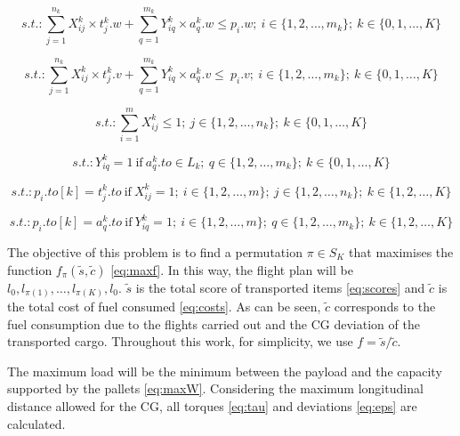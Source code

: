 \documentclass[preprint,authoryear]{elsarticle}
\begin{document}
\begin{equation} \label{eq:app2}
	s.t.: \sum_{j=1}^{n_k} X_{ij}^k \times t_j^k.w + \sum_{q=1}^{m_k} Y_{iq}^k \times a_q^k.w  \leq p_i.w; \ i \in \{1, 2, \ldots, m_k\}; \ k \in \{0, 1, \ldots, K\}
\end{equation}

\begin{equation} \label{eq:app3}
	s.t.: \sum_{j=1}^{n_k} X_{ij}^k \times t_j^k.v + \sum_{q=1}^{m_k} Y_{iq}^k \times a_q^k.v  \leq\ p_i.v; \ i \in \{1, 2, \ldots, m_k\}; \ k \in \{0, 1, \ldots, K\}
\end{equation}

\begin{equation} \label{eq:app4}
	s.t.: \sum_{i=1}^{m} X_{ij}^k \leq 1; \ j \in \{1, 2, \ldots, n_k\}; \ k \in \{0, 1, \ldots, K\}
\end{equation}

\begin{equation} \label{eq:app5}
	s.t.:  Y_{iq}^k = 1 \ \mbox{if} \ a^k_q.to \in L_k; \ q \in \{1, 2, \ldots, m_k\}; \ k \in \{0, 1, \ldots, K\}
\end{equation}

\begin{equation} \label{eq:pdp8}
	s.t.: p_i.to[k] = t^k_j.to\ \mbox{if} \ X_{ij}^k = 1; \ i \in \{1, 2, \ldots, m\}; \ j \in \{1, 2, \ldots, n_k\}; \ k \in \{1, 2, \ldots, K\}
\end{equation}

\begin{equation} \label{eq:pdp2}
	s.t.:  p_i.to[k] = a^k_q.to\ \mbox{if} \ Y_{iq}^k = 1; \ i \in \{1, 2, \ldots, m\};\ q \in \{1, 2, \ldots, m_k\}; \ k \in \{1, 2, \ldots, K\}
\end{equation}


The objective of this problem is to find a permutation $\pi \in S_K$\/ that maximises the function $f_\pi(\tilde{s},\tilde{c})$ \ref{eq:maxf}. In this way, the flight plan will be $l_0, l_{\pi(1)}, \ldots, l_{\pi(K)}, l_0$. $\tilde{s}$\/ is the total score of transported items \ref{eq:scores} and  $\tilde{c}$\/ is the total cost of fuel consumed \ref{eq:costs}. As can be seen, $\tilde{c}$\/ corresponds to the fuel consumption due to the flights carried out and the CG deviation of the transported cargo. Throughout this work, for simplicity, we use $f=\tilde{s}/\tilde{c}$.

The maximum load will be the minimum between the payload and the capacity supported by the pallets \ref{eq:maxW}. Considering the maximum longitudinal distance allowed for the CG, all torques \ref{eq:tau} and deviations \ref{eq:eps} are calculated.
\end{document}
